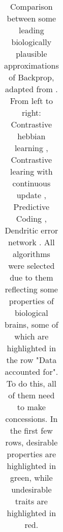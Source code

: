 \begin{table}[h]
{\begin{tabular}{|ll|ll|ll|}
    \end{tabular}
  }\caption{
    Comparison between some leading biologically plausible approximations of Backprop, adapted from
    \cite{whittington2019theories}. From left to right: Contrastive hebbian learning \citep{OReilly1996},
    Contrastive learing with continuous update \citep{Bengio2017}, Predictive Coding
    \citep{Whittington2017,rao1999predictive}, Dendritic error network \citep{sacramento2018dendritic}. All
    algorithms were selected due to them reflecting some properties of biological brains, some of which are
    highlighted in the row "Data accounted for". To do this, all of them need to make concessions. In the first
    few rows, desirable properties are highlighted in green, while undesirable traits are highlighted in red.}\label{tab-wb-models}
  
\end{table}


